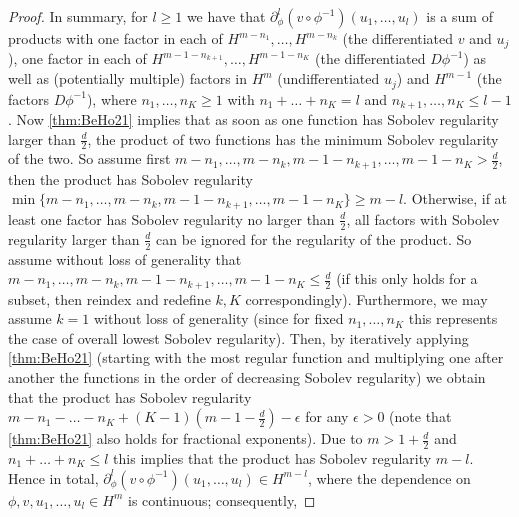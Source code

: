 \documentclass[a4paper, 12pt]{article}
\newcommand{\R}{\mathbb{R}}
\newcommand{\T}{\mathbb{T}}
\begin{document}
\begin{proof}
In summary, for $l\geq1$ we have that $\partial_\phi^l(v\circ\phi^{-1})(u_1,\ldots,u_l)$ is a sum of products
with one factor in each of $H^{m-n_1},\ldots,H^{m-n_k}$ (the differentiated $v$ and $u_j$), one factor in each of $H^{m-1-n_{k+1}},\ldots,H^{m-1-n_K}$ (the differentiated $D\phi^{-1}$)
as well as (potentially multiple) factors in $H^m$ (undifferentiated $u_j$) and $H^{m-1}$ (the factors $D\phi^{-1}$),
where $n_1,\ldots,n_K\geq1$ with $n_1+\ldots+n_K=l$ and $n_{k+1},\ldots,n_K\leq l-1$.
Now \cref{thm:BeHo21} implies that as soon as one function has Sobolev regularity larger than $\frac d2$, the product of two functions has the minimum Sobolev regularity of the two.
So assume first $m-n_1,\ldots,m-n_k,m-1-n_{k+1},\ldots,m-1-n_K>\frac d2$, then the product has Sobolev regularity $\min\{m-n_1,\ldots,m-n_k,m-1-n_{k+1},\ldots,m-1-n_K\}\geq m-l$.
Otherwise, if at least one factor has Sobolev regularity no larger than $\frac d2$, all factors with Sobolev regularity larger than $\frac d2$ can be ignored for the regularity of the product.
So assume without loss of generality that $m-n_1,\ldots,m-n_k,m-1-n_{k+1},\ldots,m-1-n_K\leq\frac d2$ (if this only holds for a subset, then reindex and redefine $k,K$ correspondingly).
Furthermore, we may assume $k=1$ without loss of generality (since for fixed $n_1,\ldots,n_K$ this represents the case of overall lowest Sobolev regularity).
Then, by iteratively applying \cref{thm:BeHo21} (starting with the most regular function and multiplying one after another the functions in the order of decreasing Sobolev regularity)
we obtain that the product has Sobolev regularity $m-n_1-\ldots-n_K+(K-1)(m-1-\frac d2)-\epsilon$ for any $\epsilon>0$ (note that \cref{thm:BeHo21} also holds for fractional exponents).
Due to $m>1+\frac d2$ and $n_1+\ldots+n_K\leq l$ this implies that the product has Sobolev regularity $m-l$.
Hence in total, $\partial_\phi^l(v\circ\phi^{-1})(u_1,\ldots,u_l)\in H^{m-l}$, where the dependence on $\phi,v,u_1,\ldots,u_l\in H^m$ is continuous;
consequently,

\end{proof}
\end{document}
